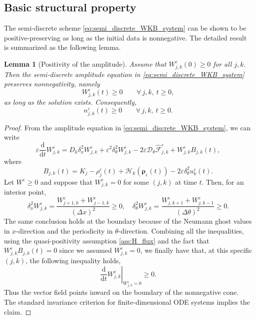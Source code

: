\documentclass[11pt]{article}
\numberwithin{equation}{section}
\newtheorem{lemma}{Lemma}[section]
\begin{document}
\subsection{Basic structural property}

The semi-discrete scheme \eqref{eq:semi_discrete_WKB_system} can be shown to be positive-preserving 
as long as the initial data is nonnegative. 
The detailed result is summarized as the following lemma. 

\begin{lemma}[Positivity of the amplitude]
\label{lem:positivity_W}
Assume that \(W_{j,k}^\varepsilon(0)\ge0\) for all \(j,k\). Then the
semi-discrete amplitude equation in \eqref{eq:semi_discrete_WKB_system}
preserves nonnegativity, namely
\[
    W_{j,k}^\varepsilon(t)\ge0
    \qquad
    \forall\,j,k,\ t\ge0,
\]
as long as the solution exists. Consequently,
\[
    n_{j,k}^\varepsilon(t)\ge0
    \qquad
    \forall\,j,k,\ t\ge0 .
\]
\end{lemma}

\begin{proof}
From the amplitude
equation in \eqref{eq:semi_discrete_WKB_system}, we can write
\[
\varepsilon \frac{\mathrm d}{\mathrm dt}W_{j,k}^\varepsilon
=
D_k\delta_x^2W_{j,k}^\varepsilon
+
\varepsilon^2\delta_\theta^2W_{j,k}^\varepsilon
-
2\varepsilon
\mathcal D_\theta\widehat{\mathcal F}^\varepsilon_{j,k}
+
W_{j,k}^\varepsilon B_{j,k}(t),
\]
where
\[
B_{j,k}(t)
=
K_j-\rho_{j}^\varepsilon(t)
+\mathcal H_k(\boldsymbol\rho_\varepsilon(t))
-2\varepsilon\delta_\theta^2u_k^\varepsilon(t).
\]
Let \(W^\varepsilon\ge0\) and suppose that
\(W_{j,k}^\varepsilon=0\) for some \((j,k)\) at time $t$. Then, for an interior point,
\[
\delta_x^2W_{j,k}^\varepsilon
=
\frac{W_{j+1,k}^\varepsilon+W_{j-1,k}^\varepsilon}{(\Delta x)^2}
\ge0, 
\quad 
\delta_\theta^2W_{j,k}^\varepsilon
=
\frac{W_{j,k+1}^\varepsilon+W_{j,k-1}^\varepsilon}{(\Delta\theta)^2}
\ge0 .
\]
The same conclusion holds at the boundary because of the Neumann ghost
values in $x$-direction and the periodicity in \(\theta\)-direction. 
Combining all the inequalities, using the quasi-positivity assumption \eqref{ass:H_flux} and the fact that 
\(
    W_{j,k}^\varepsilon B_{j,k}(t)=0 
\)
since we assumed $W_{j,k}^\varepsilon=0$, 
we finally have that, at this specific $(j,k)$, the following inequality holds, 
\[
\left.
\frac{\mathrm d}{\mathrm dt}W_{j,k}^\varepsilon
\right|_{W_{j,k}^\varepsilon=0}
\ge0 .
\]
Thus the vector field points inward on the boundary of the nonnegative cone.
The standard invariance criterion for finite-dimensional ODE systems implies
the claim.
\end{proof}
\end{document}
